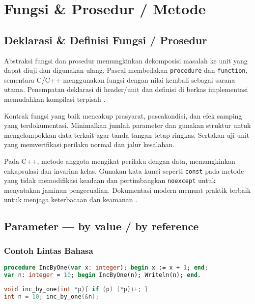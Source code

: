 \documentclass[../main.tex]{subfiles}
\begin{document}
\chapter{Fungsi \& Prosedur / Metode}
\section{Deklarasi \& Definisi Fungsi / Prosedur}
Abstraksi fungsi dan prosedur memungkinkan dekomposisi masalah ke unit yang dapat diuji dan digunakan ulang. Pascal membedakan \texttt{procedure} dan \texttt{function}, sementara C/C++ menggunakan fungsi dengan nilai kembali sebagai sarana utama. Penempatan deklarasi di header/unit dan definisi di berkas implementasi memudahkan kompilasi terpisah \parencite{pascal-procedure-function,c-functions,cpp-functions}.

Kontrak fungsi yang baik mencakup prasyarat, pascakondisi, dan efek samping yang terdokumentasi. Minimalkan jumlah parameter dan gunakan struktur untuk mengelompokkan data terkait agar tanda tangan tetap ringkas. Sertakan uji unit yang memverifikasi perilaku normal dan jalur kesalahan.

Pada C++, metode anggota mengikat perilaku dengan data, memungkinkan enkapsulasi dan invarian kelas. Gunakan kata kunci seperti \texttt{const} pada metode yang tidak memodifikasi keadaan dan pertimbangkan \texttt{noexcept} untuk menyatakan jaminan pengecualian. Dokumentasi modern memuat praktik terbaik untuk menjaga keterbacaan dan keamanan \parencite{cpp-functions,cpp-reference}.

\section{Parameter — by value / by reference}
\subsection{Contoh Lintas Bahasa}
\begin{lstlisting}[language=Pascal, caption={Parameter by value vs var (Pascal)}]
procedure IncByOne(var x: integer); begin x := x + 1; end;
var n: integer = 10; begin IncByOne(n); Writeln(n); end.
\end{lstlisting}

\begin{lstlisting}[language=C, caption={By value dan via pointer (C)}]
void inc_by_one(int *p){ if (p) (*p)++; }
int n = 10; inc_by_one(&n);
\end{lstlisting}
\end{document}
